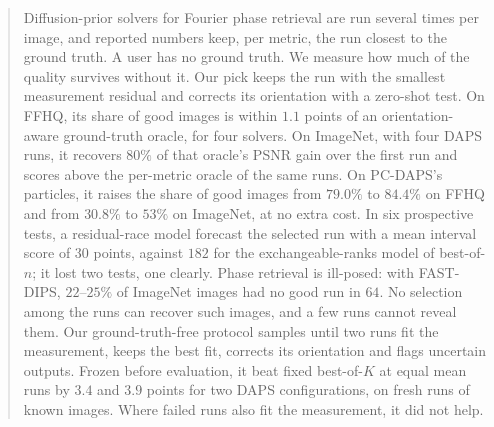 \begin{abstract}
Diffusion-prior solvers for Fourier phase retrieval are run several times per image, and reported numbers keep, per metric, the run closest to the ground truth.
A user has no ground truth.
We measure how much of the quality survives without it.
Our pick keeps the run with the smallest measurement residual and corrects its orientation with a zero-shot test.
On FFHQ, its share of good images is within $1.1$ points of an orientation-aware ground-truth oracle, for four solvers.
On ImageNet, with four DAPS runs, it recovers $80\%$ of that oracle's PSNR gain over the first run and scores above the per-metric oracle of the same runs.
On PC-DAPS's particles, it raises the share of good images from $79.0\%$ to $84.4\%$ on FFHQ and from $30.8\%$ to $53\%$ on ImageNet, at no extra cost.
In six prospective tests, a residual-race model forecast the selected run with a mean interval score of $30$ points, against $182$ for the exchangeable-ranks model of best-of-$n$; it lost two tests, one clearly.
Phase retrieval is ill-posed: with FAST-DIPS, $22$--$25\%$ of ImageNet images had no good run in $64$.
No selection among the runs can recover such images, and a few runs cannot reveal them.
Our ground-truth-free protocol samples until two runs fit the measurement, keeps the best fit, corrects its orientation and flags uncertain outputs.
Frozen before evaluation, it beat fixed best-of-$K$ at equal mean runs by $3.4$ and $3.9$ points for two DAPS configurations, on fresh runs of known images.
Where failed runs also fit the measurement, it did not help.
\end{abstract}
